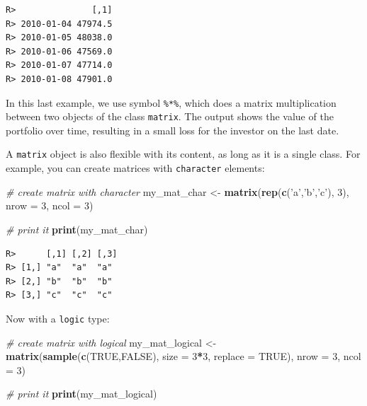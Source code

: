 \documentclass[
  12pt,
]{book}
\newenvironment{Shaded}{\begin{snugshade}}{\end{snugshade}}
\newcommand{\CommentTok}[1]{\textcolor[rgb]{0.37,0.37,0.37}{\textit{#1}}}
\newcommand{\DataTypeTok}[1]{\textcolor[rgb]{0.27,0.27,0.27}{#1}}
\newcommand{\DecValTok}[1]{\textcolor[rgb]{0.06,0.06,0.06}{#1}}
\newcommand{\KeywordTok}[1]{\textcolor[rgb]{0.27,0.27,0.27}{\textbf{#1}}}
\newcommand{\NormalTok}[1]{#1}
\newcommand{\OperatorTok}[1]{\textcolor[rgb]{0.43,0.43,0.43}{\textbf{#1}}}
\newcommand{\OtherTok}[1]{\textcolor[rgb]{0.37,0.37,0.37}{#1}}
\newcommand{\StringTok}[1]{\textcolor[rgb]{0.5,0.5,0.5}{#1}}
\begin{document}
\begin{verbatim}
R>               [,1]
R> 2010-01-04 47974.5
R> 2010-01-05 48038.0
R> 2010-01-06 47569.0
R> 2010-01-07 47714.0
R> 2010-01-08 47901.0
\end{verbatim}

In this last example, we use symbol \texttt{\%*\%}, which does a matrix multiplication between two objects of the class \texttt{matrix}. The output shows the value of the portfolio over time, resulting in a small loss for the investor on the last date.  

A \texttt{matrix} object is also flexible with its content, as long as it is a single class. For example, you can create matrices with \texttt{character} elements:

\begin{Shaded}
\begin{Highlighting}[]
\CommentTok{# create matrix with character}
\NormalTok{my_mat_char <-}\StringTok{ }\KeywordTok{matrix}\NormalTok{(}\KeywordTok{rep}\NormalTok{(}\KeywordTok{c}\NormalTok{(}\StringTok{'a'}\NormalTok{,}\StringTok{'b'}\NormalTok{,}\StringTok{'c'}\NormalTok{), }\DecValTok{3}\NormalTok{), }
                      \DataTypeTok{nrow =} \DecValTok{3}\NormalTok{, }
                      \DataTypeTok{ncol =} \DecValTok{3}\NormalTok{)}

\CommentTok{# print it                    }
\KeywordTok{print}\NormalTok{(my_mat_char)}
\end{Highlighting}
\end{Shaded}

\begin{verbatim}
R>      [,1] [,2] [,3]
R> [1,] "a"  "a"  "a" 
R> [2,] "b"  "b"  "b" 
R> [3,] "c"  "c"  "c"
\end{verbatim}

Now with a \texttt{logic} type:

\begin{Shaded}
\begin{Highlighting}[]
\CommentTok{# create matrix with logical}
\NormalTok{my_mat_logical <-}\StringTok{ }\KeywordTok{matrix}\NormalTok{(}\KeywordTok{sample}\NormalTok{(}\KeywordTok{c}\NormalTok{(}\OtherTok{TRUE}\NormalTok{,}\OtherTok{FALSE}\NormalTok{), }
                                \DataTypeTok{size =} \DecValTok{3}\OperatorTok{*}\DecValTok{3}\NormalTok{,}
                                \DataTypeTok{replace =} \OtherTok{TRUE}\NormalTok{),}
                         \DataTypeTok{nrow =} \DecValTok{3}\NormalTok{, }
                         \DataTypeTok{ncol =} \DecValTok{3}\NormalTok{)}

\CommentTok{# print it                    }
\KeywordTok{print}\NormalTok{(my_mat_logical)}
\end{Highlighting}
\end{Shaded}
\end{document}
